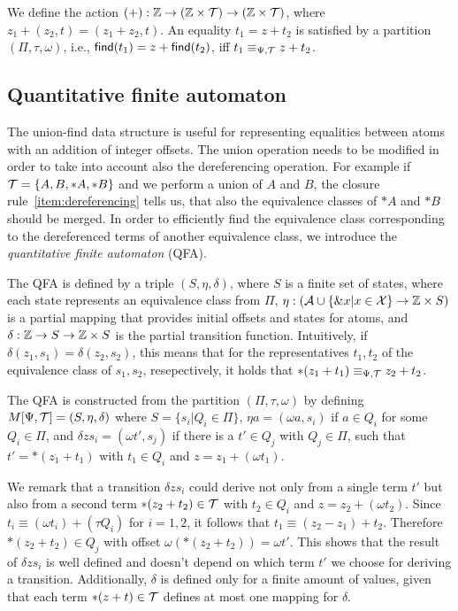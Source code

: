 We define the action $(+): \mathbb{Z} \rightarrow (\mathbb{Z} \times \mathcal{T}) \rightarrow (\mathbb{Z} \times \mathcal{T})$, where $z_1 + (z_2,t) = (z_1 + z_2, t)$.
An equality $t_1 = z + t_2$ is satisfied by a partition $(\Pi, \tau, \omega)$, i.e., $\textsf{find}(t_1) = z + \textsf{find}(t_2)$, iff $t_1 \equiv_{\Psi,\mathcal{T}} z + t_2$.

\subsection{Quantitative finite automaton}\label{subsection:qfa}

The union-find data structure is useful for representing equalities between atoms
with an addition of integer offsets.
The union operation needs to be modified in order to take into account also the dereferencing operation.
For example if $\mathcal{T} = \{A, B, *A, *B\}$ and we perform a union of $A$ and $B$, the
closure rule~\ref{item:dereferencing} tells us, that also the equivalence classes of $*A$ and $*B$ should be merged.
In order to efficiently find the equivalence class corresponding to the dereferenced terms of another equivalence class, we introduce the \emph{quantitative finite automaton} (QFA).

The QFA is defined by a triple $(S, \eta, \delta)$, where $S$ is a finite set of states, where each state represents an equivalence class from $\Pi$, $\eta : (\mathcal{A} \cup \{\&x | x \in \mathcal{X}\} \rightarrow \mathbb{Z} \times S)$ is a partial mapping that provides initial offsets and states for atoms, and $\delta : \mathbb{Z} \rightarrow S \rightarrow \mathbb{Z} \times S$ is the partial transition function.
Intuitively, if $\delta(z_1, s_1) = \delta(z_2, s_2)$, this means that for the representatives
$t_1, t_2$ of the equivalence class of $s_1,s_2$, resepectively, it holds that $*(z_1 + t_1) \equiv_{\Psi,\mathcal{T}} z_2 + t_2$.

The QFA is constructed from the partition  $(\Pi, \tau, \omega)$ by defining $M[\Psi,\mathcal{T}] = (S, \eta, \delta)$ where $S = \{s_i | Q_i \in \Pi\}$, $\eta a = (\omega a, s_i)$ if $a \in Q_i$ for some $Q_i \in \Pi$, and $\delta z s_i = (\omega t', s_j)$ if there is a $t' \in Q_j$ with $Q_j \in \Pi$, such that $t' = *(z_1 + t_1)$ with $t_1 \in Q_i$ and $z = z_1 + (\omega t_1)$.

We remark that a transition $\delta z s_i$ could derive not only from a single term $t'$ but also from a second term $*(z_2 + t_2) \in \mathcal{T}$ with $t_2 \in Q_i$ and $z = z_2 + (\omega t_2)$.
Since $t_i \equiv (\omega t_i) + (\tau Q_i)$ for $i = 1,2$, it follows that $t_1 \equiv (z_2 - z_1)+ t_2$. Therefore $*(z_2+t_2)\in Q_j$ with offset $\omega(*(z_2+t_2)) = \omega t'$.
This shows that the result of $\delta z s_i$ is well defined and doesn't depend on which term $t'$ we choose for deriving a transition.
Additionally, $\delta$ is defined only for a finite amount of values, given that each term $*(z + t) \in \mathcal{T}$ defines at most one mapping for $\delta$.

